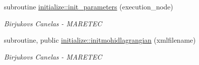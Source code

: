 \begin{DoxyCompactItemize}
subroutine \hyperlink{namespaceinitialize_a7a54dc126f448bea2b566339a449f85c}{initialize\+::init\+\_\+parameters} (execution\+\_\+node)
\begin{DoxyCompactList}\small\item\em Birjukovs Canelas -\/ M\+A\+R\+E\+T\+EC \end{DoxyCompactList}\item 
subroutine, public \hyperlink{namespaceinitialize_a45b7ca20c45cf272acbc391950cbb804}{initialize\+::initmohidlagrangian} (xmlfilename)
\begin{DoxyCompactList}\small\item\em Birjukovs Canelas -\/ M\+A\+R\+E\+T\+EC \end{DoxyCompactList}\end{DoxyCompactItemize}
